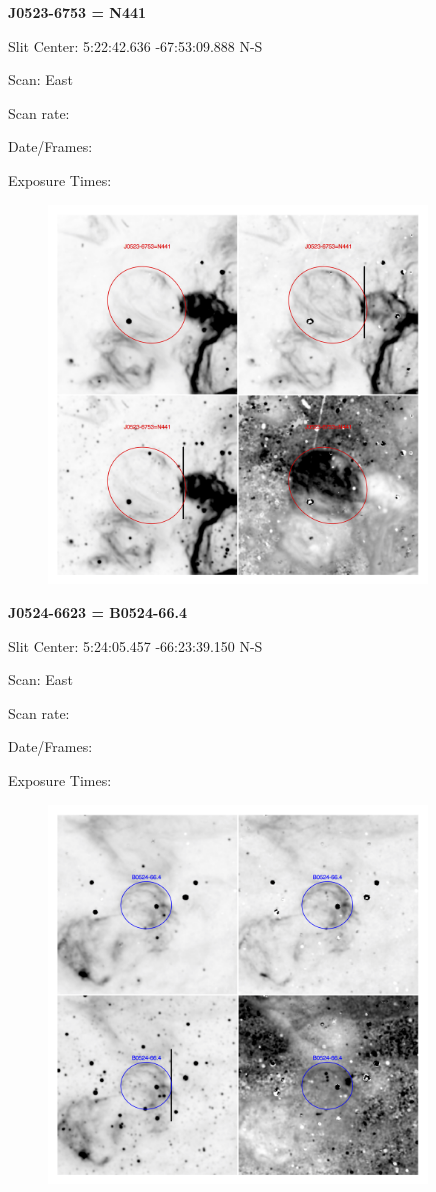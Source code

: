 \documentclass[11pt]{article}
\begin{document}
\newpage
{\bf J0523-6753 = N441}  
 
Slit Center:   5:22:42.636  -67:53:09.888 N-S

Scan:  East

Scan rate:  

Date/Frames:

Exposure Times:  

\begin{figure}
\includegraphics[width=10.05cm]{snapshots/J0523-6753.png}
\end{figure}

\newpage
{\bf J0524-6623 = B0524-66.4}  
 
Slit Center:   5:24:05.457   -66:23:39.150 N-S

Scan:  East

Scan rate:  

Date/Frames:

Exposure Times:  

\begin{figure}
\includegraphics[width=10.05cm]{snapshots/B0524-664.png}
\end{figure}
\end{document}
